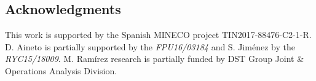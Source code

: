 \documentclass[letterpaper]{article} %
\begin{document}
\subsection*{Acknowledgments}
This work is supported by the Spanish MINECO project TIN2017-88476-C2-1-R. D. Aineto is partially supported by the {\it FPU16/03184} and S. Jim\'enez by the {\it RYC15/18009}. M. Ram\'irez research is partially funded by DST Group Joint \& Operations Analysis Division.



\end{document}
